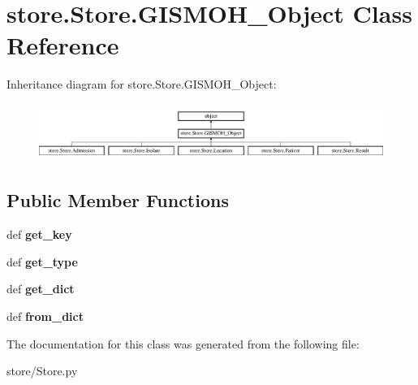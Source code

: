 \hypertarget{classstore_1_1_store_1_1_g_i_s_m_o_h___object}{\section{store.\-Store.\-G\-I\-S\-M\-O\-H\-\_\-\-Object Class Reference}
\label{classstore_1_1_store_1_1_g_i_s_m_o_h___object}
}
Inheritance diagram for store.\-Store.\-G\-I\-S\-M\-O\-H\-\_\-\-Object\-:\begin{figure}[H]
\begin{center}
\leavevmode
\includegraphics[height=1.866667cm]{classstore_1_1_store_1_1_g_i_s_m_o_h___object}
\end{center}
\end{figure}
\subsection*{Public Member Functions}
\begin{DoxyCompactItemize}
\item 
\hypertarget{classstore_1_1_store_1_1_g_i_s_m_o_h___object_ac3391d8ff49f41c4d90d8692fcf9ee8e}{def {\bfseries get\-\_\-key}}\label{classstore_1_1_store_1_1_g_i_s_m_o_h___object_ac3391d8ff49f41c4d90d8692fcf9ee8e}

\item 
\hypertarget{classstore_1_1_store_1_1_g_i_s_m_o_h___object_ab955e952f3fad2c1cc1909cf79bbfd25}{def {\bfseries get\-\_\-type}}\label{classstore_1_1_store_1_1_g_i_s_m_o_h___object_ab955e952f3fad2c1cc1909cf79bbfd25}

\item 
\hypertarget{classstore_1_1_store_1_1_g_i_s_m_o_h___object_a9b9e18740c48aedb2751ffbe62ca5f50}{def {\bfseries get\-\_\-dict}}\label{classstore_1_1_store_1_1_g_i_s_m_o_h___object_a9b9e18740c48aedb2751ffbe62ca5f50}

\item 
\hypertarget{classstore_1_1_store_1_1_g_i_s_m_o_h___object_a2e3683c267f623cd7740c7f47da42880}{def {\bfseries from\-\_\-dict}}\label{classstore_1_1_store_1_1_g_i_s_m_o_h___object_a2e3683c267f623cd7740c7f47da42880}

\end{DoxyCompactItemize}


The documentation for this class was generated from the following file\-:\begin{DoxyCompactItemize}
\item 
store/Store.\-py\end{DoxyCompactItemize}
